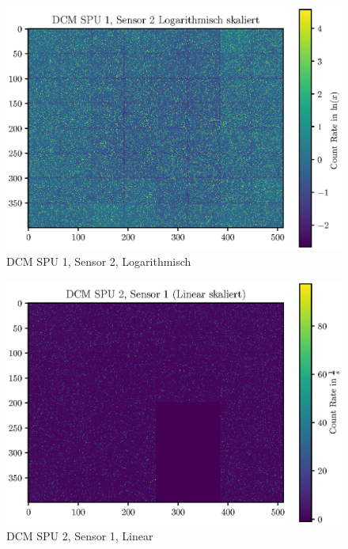 \documentclass[12pt,twoside,a4paper]{scrartcl}
\begin{document}
		\begin{figure}[H]
			\includegraphics[width = \textwidth]{Plots/DCM/DCM_SPU1_Sensor2_log.eps}
			\caption{DCM SPU 1, Sensor 2, Logarithmisch}
		\end{figure}

		\begin{figure}[H]
			\includegraphics[width = \textwidth]{Plots/DCM/DCM_SPU2_Sensor1_lin.eps}
			\caption{DCM SPU 2, Sensor 1, Linear}
		\end{figure}
\end{document}
